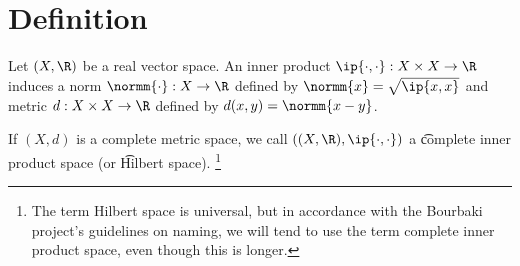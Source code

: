 
\section*{Definition}

Let $(X, \R )$ be a real vector space. An inner product $\ip{\cdot ,\cdot }: X\times X \to \R $ induces a norm $\normm{\cdot }: X \to \R $ defined by $\normm{x} = \sqrt{\ip{x,x}}$ and metric $d: X \times X \to \R $ defined by $d(x, y) = \normm{x - y}$.

If $(X, d)$ is a complete metric space, we call $((X, \R ), \ip{\cdot ,\cdot })$ a \t{complete inner product space} (or \t{Hilbert space}).
  \ifhmode\unskip\fi\footnote{
The term Hilbert space is universal, but in accordance with the Bourbaki project's guidelines on naming, we will tend to use the term complete inner product space, even though this is longer.
  }

\blankpage

